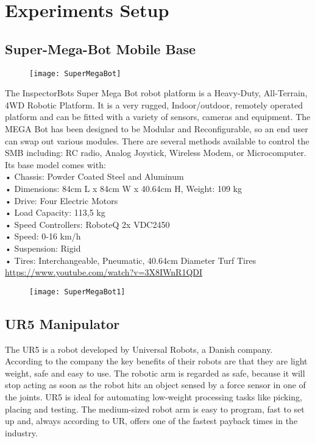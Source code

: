\chapter{Experiments Setup}
\label{chapter6}

\section{Super-Mega-Bot Mobile Base}
\begin{figure}[h]
	\begin{center} 
		\texttt{[image: SuperMegaBot]}
		\centering
		\label{fig:SuperMegaBot} 
	\end{center}
\end{figure}

The InspectorBots Super Mega Bot robot platform is a Heavy-Duty, All-Terrain, 4WD Robotic Platform. It is a very rugged, Indoor/outdoor, remotely operated platform and can be fitted with a variety of sensors, cameras and equipment. The MEGA Bot has been designed to be Modular and Reconfigurable, so an end user can swap out various modules. There are several methods available to control the SMB including: RC radio, Analog Joystick, Wireless Modem, or Microcomputer.\\
Its base model comes with:\\
•	Chassis: Powder Coated Steel and Aluminum \\
•	Dimensions: 84cm L x 84cm W x 40.64cm H, Weight: 109 kg\\
•	Drive: Four Electric Motors\\
•	Load Capacity: 113,5 kg\\
•	Speed Controllers: RoboteQ 2x VDC2450\\
•	Speed: 0-16 km/h \\
•	Suspension: Rigid\\
•	Tires: Interchangeable, Pneumatic, 40.64cm Diameter Turf Tires\\
\url{https://www.youtube.com/watch?v=3X8IWnR1QDI}
\begin{figure}[h]
	\begin{center} 
		\texttt{[image: SuperMegaBot1]}
		\centering
		\label{fig:SuperMegaBot1}
	\end{center}
\end{figure}

\section{UR5 Manipulator}
The UR5 is a robot developed by Universal Robots, a Danish company. According to the company the key benefits of their robots are that they are light weight, safe and easy to use. The robotic arm is regarded as safe, because it will stop acting as soon as the robot hits an object sensed by a force sensor in one of the joints. UR5 is ideal for automating low-weight processing tasks like picking, placing and testing. The medium-sized robot arm is easy to program, fast to set up and, always according to UR, offers one of the fastest payback times in the industry.

